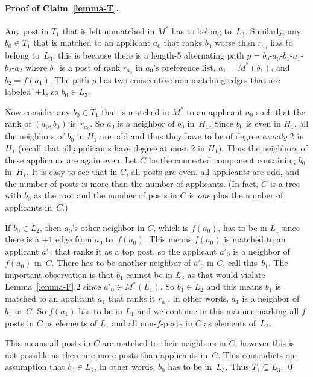\documentclass[11pt]{llncs}
\begin{document}
\paragraph{Proof of Claim~\ref{lemma-T}.}
Any post in $T_1$ that is left unmatched in $M^*$ has to belong to~$L_3$. Similarly, any $b_0 \in T_1$ that is
matched to an applicant $a_0$ that ranks $b_0$ worse than $r_{a_0}$ has to belong to~$L_3$: this is 
because there is a length-5 alternating path $p = b_0$-$a_0$-$b_1$-$a_1$-$b_2$-$a_2$ where $b_1$ is a post of rank $r_{a_0}$ 
in $a_0$'s preference list, $a_1 = M^*(b_1)$, and $b_2 = f(a_1)$. The path $p$ has
two consecutive non-matching edges that are labeled~$+1$, so $b_0 \in L_3$.

Now consider any $b_0 \in T_1$ that is matched in $M^*$ to an applicant $a_0$ such that the rank of 
$(a_0,b_0)$ is~$r_{a_0}$. So $a_0$ is a neighbor of $b_0$ in~$H_1$.
Since $b_0$ is even in $H_1$, all the neighbors of $b_0$ in $H_1$ are odd and thus they have to be of
degree {\em exactly} 2 in $H_1$ (recall that  all applicants have degree at most 2 in $H_1$).
Thus the neighbors of these applicants are again even. Let  $C$ be the connected component containing $b_0$ 
in~$H_1$. It is easy to see that in $C$, all posts are even, all applicants are odd, and the
number of posts is more than the number of applicants. (In fact, $C$ is a tree with $b_0$ as the root and  
the number of posts in $C$ is {\em one} plus the number of applicants in~$C$.)

If $b_0 \in L_2$, then $a_0$'s other neighbor in $C$, which is $f(a_0)$, has to be in $L_1$ since
there is a $+1$ edge from $a_0$ to~$f(a_0)$. This means $f(a_0)$ is matched to an applicant $a'_0$ that ranks
it as a top post, so the applicant $a'_0$ is a neighbor of $f(a_0)$ in~$C$. There has to be another
neighbor of $a'_0$ in $C$, call this~$b_1$. The important observation is that $b_1$ cannot be in $L_3$ as that would
violate Lemma~\ref{lemma-F}.2 since $a'_0 \in M^*(L_1)$. So $b_1 \in L_2$ and this means $b_1$ is matched to an
applicant $a_1$ that ranks it $r_{a_1}$, in other words, $a_1$ is a neighbor of $b_1$ in~$C$. So $f(a_1)$ has to be in $L_1$ 
and we continue in this manner marking all $f$-posts in $C$ as elements of $L_1$ and all non-$f$-posts in $C$ as elements 
of~$L_2$. 

This means all posts in $C$ are matched to their neighbors in $C$, however this is not possible as there are more posts 
than applicants in~$C$.  This contradicts our assumption that $b_0 \in L_2$, in other words, $b_0$ has to be in~$L_3$. Thus 
$T_1 \subseteq L_3$. \qed
\end{document}
